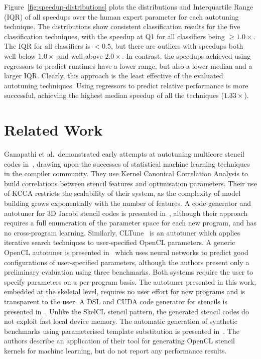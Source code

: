 \documentclass[preprint,nonatbib,10pt]{sigplanconf}
\begin{document}
Figure~\ref{fig:speedup-distributions} plots the distributions and
Interquartile Range (IQR) of all speedups over the human expert
parameter for each autotuning technique. The distributions show
consistent classification results for the five classification
techniques, with the speedup at Q1 for all classifiers being
$\ge 1.0\times$. The IQR for all classifiers is $< 0.5$, but there are
outliers with speedups both well below $1.0\times$ and well above
$2.0\times$. In contrast, the speedups achieved using regressors to
predict runtimes have a lower range, but also a lower median and a
larger IQR. Clearly, this approach is the least effective of the
evaluated autotuning techniques. Using regressors to predict relative
performance is more successful, achieving the highest median speedup
of all the techniques ($1.33\times$).


\section{Related Work}\label{sec:related}

Ganapathi et al.\ demonstrated early attempts at autotuning multicore
stencil codes in~\cite{Ganapathi2009}, drawing upon the successes of
statistical machine learning techniques in the compiler
community. They use Kernel Canonical Correlation Analysis to build
correlations between stencil features and optimisation
parameters. Their use of KCCA restricts the scalability of their
system, as the complexity of model building grows exponentially with
the number of features. A code generator and autotuner for 3D Jacobi
stencil codes is presented in~\cite{Zhang2013a}, although their
approach requires a full enumeration of the parameter space for each
new program, and has no cross-program learning. Similarly,
CLTune~\cite{Nugteren2015} is an autotuner which applies iterative
search techniques to user-specified OpenCL parameters. A generic
OpenCL autotuner is presented in~\cite{Falch2015} which uses neural
networks to predict good configurations of user-specified parameters,
although the authors present only a preliminary evaluation using three
benchmarks. Both systems require the user to specify parameters on a
per-program basis. The autotuner presented in this work, embedded at
the skeletal level, requires no user effort for new programs and is
transparent to the user. A DSL and CUDA code generator for stencils is
presented in~\cite{Kamil2010}. Unlike the SkelCL stencil pattern, the
generated stencil codes do not exploit fast local device memory. The
automatic generation of synthetic benchmarks using parameterised
template substitution is presented in~\cite{Chiu2015}. The authors
describe an application of their tool for generating OpenCL stencil
kernels for machine learning, but do not report any performance
results.
\end{document}
